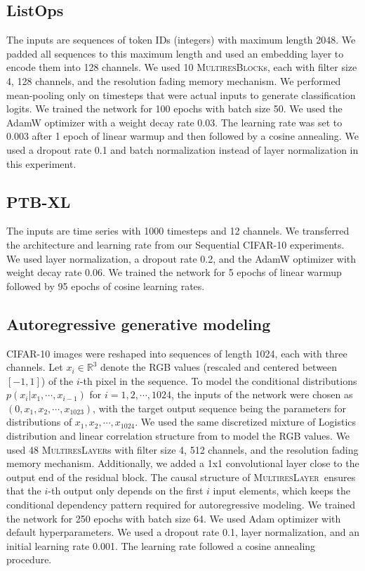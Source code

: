 \documentclass{article}
\theoremstyle{plain}
\theoremstyle{definition}
\theoremstyle{remark}
\newcommand{\ourlayer}{\textsc{MultiresLayer}}
\newcommand{\ourblock}{\textsc{MultiresBlock}}
\begin{document}
\subsection{ListOps}

The inputs are sequences of token IDs (integers) with maximum length 2048. 
We padded all sequences to this maximum length and used an embedding layer to encode them into 128 channels. 
We used 10 \ourblock s, each with filter size 4, 128 channels, and the resolution fading memory mechanism. 
We performed mean-pooling only on timesteps that were actual inputs to generate classification logits. 
We trained the network for 100 epochs with batch size 50. 
We used the AdamW optimizer with a weight decay rate 0.03. 
The learning rate was set to 0.003 after 1 epoch of linear warmup and then followed by a cosine annealing. 
We used a dropout rate 0.1 and batch normalization instead of layer normalization in this experiment. 

\subsection{PTB-XL}

The inputs are time series with 1000 timesteps and 12 channels. 
We transferred the architecture and learning rate from our Sequential CIFAR-10 experiments. 
We used layer normalization, a dropout rate 0.2, and the AdamW optimizer with weight decay rate 0.06. 
We trained the network for 5 epochs of linear warmup followed by 95 epochs of cosine learning rates.

\subsection{Autoregressive generative modeling}
\label{app:ar-details}

CIFAR-10 images were reshaped into sequences of length 1024, each with three channels. 
Let $x_i \in \mathbb{R}^3$ denote the RGB values (rescaled and centered between $[-1, 1]$) of the $i$-th pixel in the sequence. 
To model the conditional distributions $p(x_i|x_1, \cdots, x_{i-1})$ for $i = 1, 2, \cdots, 1024$, the inputs of the network were chosen as $(0, x_1, x_2, \cdots, x_{1023})$, with the target output sequence being the parameters for distributions of $x_1, x_2, \cdots, x_{1024}$. 
We used the same discretized mixture of Logistics distribution and linear correlation structure from \citet{salimans2017pixelcnn} to model the RGB values.
We used 48 \ourlayer s with filter size 4, 512 channels, and the resolution fading memory mechanism.
Additionally, we added a 1x1 convolutional layer close to the output end of the residual block. 
The causal structure of \ourlayer\ ensures that the $i$-th output only depends on the first $i$ input elements, which keeps the conditional dependency pattern required for autoregressive modeling.  
We trained the network for 250 epochs with batch size 64.
We used Adam optimizer with default hyperparameters. 
We used a dropout rate 0.1, layer normalization, and an initial learning rate 0.001. 
The learning rate followed a cosine annealing procedure. 
\end{document}

